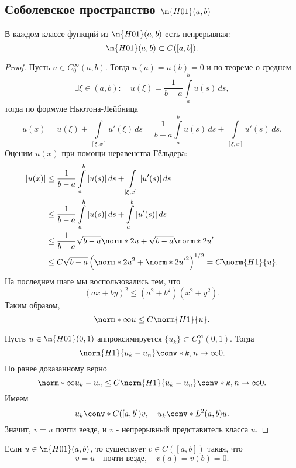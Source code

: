 \subsection{Соболевское пространство $\m{H01}(a,b)$}

\begin{theorem} В каждом классе функций из $\m{H01}(a,b)$ есть непрерывная:
 $$ \m{H01}(a,b) \subset C([a,b]) .$$
\end{theorem}
\begin{proof}
Пусть $u \in C_0^\infty (a,b)$. Тогда $u(a) = u(b) = 0$ и по теореме о среднем
$$ \exists \xi \in (a,b): \quad u(\xi) = \frac{1}{b-a} \int \limits_a^b u(s) \, ds,$$
тогда по формуле Ньютона-Лейбница
$$ u(x) = u(\xi) + \int \limits_{[\xi, x]} u'(\xi) \, ds = \frac {1} {b-a} \int \limits_a^b u(s) \, ds + \int \limits_{[\xi, x]} u'(s) \, ds.$$
Оценим $u(x)$ при помощи неравенства Гёльдера:
\begin{align*}
|u(x)| &\leq \frac {1} {b-a} \int \limits_a^b |u(s)| \, ds + \int \limits_{[\xi, x]} |u'(s)| \, ds \\
&\leq \frac {1} {b-a} \int \limits_a^b |u(s)| \, ds + \int \limits_a^b |u'(s)| \, ds \\
&\leq \frac {1} {b-a} \sqrt{b-a} \norm*{2}{u} + \sqrt{b-a} \norm*{2}{u'} \\
&\leq C \sqrt{b-a} \left( \norm*{2}{u}^2 + \norm*{2}{u'}^2 \right)^{1/2} = C \norm{H1}{u}.
\end{align*}
На последнем шаге мы воспользовались тем, что
$$ (ax + by)^2 \leq (a^2 + b^2) (x^2 + y^2).$$
Таким образом,
$$ \norm*{\infty}{u} \leq C \norm{H1}{u}.$$

Пусть $u \in \m{H01} (0,1)$ аппроксимируется $\{ u_k \} \subset C_0^\infty (0,1)$. Тогда
$$ \norm{H1}{u_k - u_n} \conv*{}{k,n \to \infty} 0.$$
По ранее доказанному верно 
$$ \norm*{\infty}{u_k - u_n} \leq C \norm{H1}{u_k - u_n} \conv*{}{k,n \to \infty} 0.$$
Имеем 
$$ u_k \conv*{C([a,b])}{} v, \quad u_k \conv*{L^2(a,b)}{} u.$$
Значит, $v = u$ почти везде, и $v$ - непрерывный представитель класса $u$.  

\end{proof}


\begin{corollary} Если $u \in \m{H01} (a,b)$, то существует $v \in C([a,b])$ такая, что
$$ v = u \quad \text{почти везде}, \quad v(a) = v(b) = 0.$$
\end{corollary}

